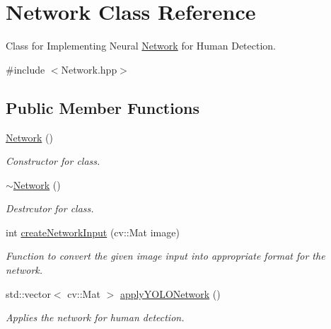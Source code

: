 \hypertarget{classNetwork}{}\section{Network Class Reference}
\label{classNetwork}


Class for Implementing Neural \hyperlink{classNetwork}{Network} for Human Detection.  




{\ttfamily \#include $<$Network.\+hpp$>$}

\subsection*{Public Member Functions}
\begin{DoxyCompactItemize}
\item 
\hyperlink{classNetwork_a3cc2fb4f8fa4d507077e8da85ce5a1c8}{Network} ()\hypertarget{classNetwork_a3cc2fb4f8fa4d507077e8da85ce5a1c8}{}\label{classNetwork_a3cc2fb4f8fa4d507077e8da85ce5a1c8}

\begin{DoxyCompactList}\small\item\em Constructor for class. \end{DoxyCompactList}\item 
\hyperlink{classNetwork_a7a4e19cdb4bf0c7ecf82baa643831492}{$\sim$\+Network} ()\hypertarget{classNetwork_a7a4e19cdb4bf0c7ecf82baa643831492}{}\label{classNetwork_a7a4e19cdb4bf0c7ecf82baa643831492}

\begin{DoxyCompactList}\small\item\em Destrcutor for class. \end{DoxyCompactList}\item 
int \hyperlink{classNetwork_a45a6aa8bbd1faf0c67024d561eba0d4d}{create\+Network\+Input} (cv\+::\+Mat image)
\begin{DoxyCompactList}\small\item\em Function to convert the given image input into appropriate format for the network. \end{DoxyCompactList}\item 
std\+::vector$<$ cv\+::\+Mat $>$ \hyperlink{classNetwork_a2db1f347f5d12693f959723039bc26f4}{apply\+Y\+O\+L\+O\+Network} ()
\begin{DoxyCompactList}\small\item\em Applies the network for human detection. \end{DoxyCompactList}\end{DoxyCompactItemize}



